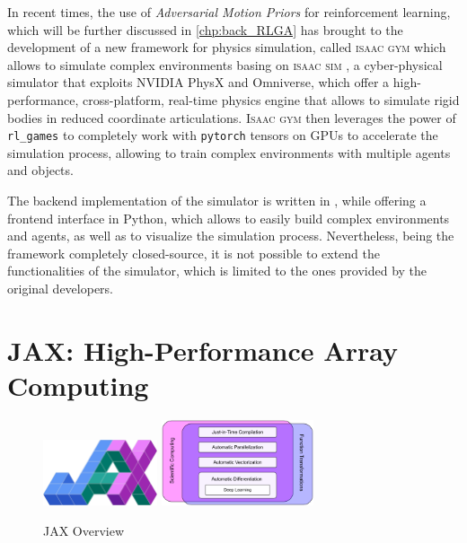 In recent times, the use of \textit{Adversarial Motion Priors} \citep{peng_amp_2021} for reinforcement learning, which will be further discussed in \cref{chp:back_RLGA} has brought to the development of a new framework for physics simulation, called \textsc{isaac gym} \citep{makoviychuk_isaac_2021} which allows to simulate complex environments basing on \textsc{isaac sim} \citep{zhou_towards_2023}, a cyber-physical simulator that exploits NVIDIA PhysX and Omniverse, which offer a high-performance, cross-platform, real-time physics engine that allows to simulate rigid bodies in reduced coordinate articulations. \textsc{Isaac gym} then leverages the power of \texttt{rl\_games} \citep{rl-games2021} to completely work with \texttt{pytorch} \citep{paszke_pytorch_2019} tensors on \ac{GPU}s to accelerate the simulation process, allowing to train complex environments with multiple agents and objects.

The backend implementation of the simulator is written in \cpp, while offering a frontend interface in Python, which allows to easily build complex environments and agents, as well as to visualize the simulation process. Nevertheless, being the framework completely closed-source, it is not possible to extend the functionalities of the simulator, which is limited to the ones provided by the original developers.

\section{JAX: High-Performance Array Computing}

\begin{figure}[h]
    \centering
    \caption{JAX Overview}
    \label{fig:jax_logo}
    \includegraphics[width=0.3\textwidth]{Images/jax_logo.png} \qquad \qquad
    \includegraphics[width=0.4\textwidth]{Images/JAX-overview.png}
\end{figure}

